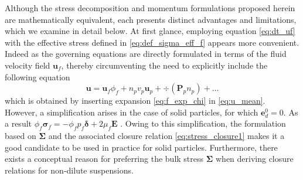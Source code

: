 Although the stress decomposition and momentum formulations proposed herein are mathematically equivalent, each presents distinct advantages and limitations, which we examine in detail below.
At first glance, employing equation \eqref{eq:dt_uf} with the effective stress defined in \eqref{eq:def_sigma_eff_f} appears more convenient. 
Indeed as the governing equations are directly formulated in terms of the fluid velocity field $\textbf{u}_f$, thereby circumventing the need to explicitly include the following equation
\begin{equation}
    \textbf{u} = \textbf{u}_f\phi_f + 
    n_pv_p\textbf{u}_p + \div  (\textbf{P}_p n_p) + \ldots
    \label{eq:velocity_conservation}
\end{equation}
which is obtained by inserting expansion \ref{eq:f_exp_chi} in \ref{eq:u_mean}.
However, a simplification arises in the case of solid particles, for which $\textbf{e}_d^0 = 0$.
As a result $\phi _f \bm \sigma _f = - \phi _f p_f \bm\delta + 2 \mu_ f \textbf{E}$ \citep{joseph1990ensemble,jackson2000}. %
Owing to this simplification, the formulation based on $\bm\Sigma$ and the associated closure relation \eqref{eq:stress_closure1} makes it a good candidate to be used in practice for solid particles. %
Furthermore, there exists a conceptual reason for preferring the bulk stress $\bm\Sigma$ when deriving closure relations for non-dilute suspensions.  %
